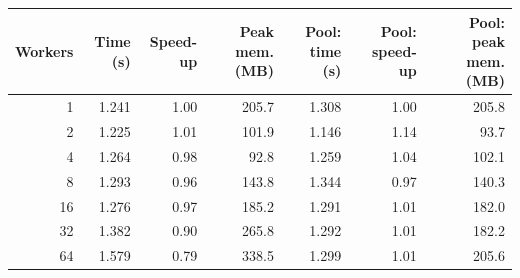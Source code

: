 \begin{tabular}{rrrrrrr}
\toprule
Workers & Time (s) & Speed-up & Peak mem. (MB) & Pool: time (s) & Pool: speed-up & Pool: peak mem. (MB) \\
\midrule
1 & 1.241 & 1.00 & 205.7 & 1.308 & 1.00 & 205.8 \\
2 & 1.225 & 1.01 & 101.9 & 1.146 & 1.14 & 93.7 \\
4 & 1.264 & 0.98 & 92.8 & 1.259 & 1.04 & 102.1 \\
8 & 1.293 & 0.96 & 143.8 & 1.344 & 0.97 & 140.3 \\
16 & 1.276 & 0.97 & 185.2 & 1.291 & 1.01 & 182.0 \\
32 & 1.382 & 0.90 & 265.8 & 1.292 & 1.01 & 182.2 \\
64 & 1.579 & 0.79 & 338.5 & 1.299 & 1.01 & 205.6 \\
\bottomrule
\end{tabular}
